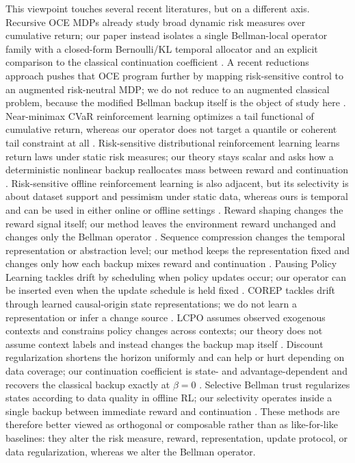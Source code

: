 \documentclass{article}
\theoremstyle{remark}
\begin{document}
This viewpoint touches several recent literatures, but on a different axis. Recursive OCE MDPs already study broad dynamic risk measures over cumulative return; our paper instead isolates a single Bellman-local operator family with a closed-form Bernoulli/KL temporal allocator and an explicit comparison to the classical continuation coefficient \citep{xu2023recursiveoce}. A recent reductions approach pushes that OCE program further by mapping risk-sensitive control to an augmented risk-neutral MDP; we do not reduce to an augmented classical problem, because the modified Bellman backup itself is the object of study here \citep{wang2025oce}. Near-minimax CVaR reinforcement learning optimizes a tail functional of cumulative return, whereas our operator does not target a quantile or coherent tail constraint at all \citep{wang2023near}. Risk-sensitive distributional reinforcement learning learns return laws under static risk measures; our theory stays scalar and asks how a deterministic nonlinear backup reallocates mass between reward and continuation \citep{chen2024distrl}. Risk-sensitive offline reinforcement learning is also adjacent, but its selectivity is about dataset support and pessimism under static data, whereas ours is temporal and can be used in either online or offline settings \citep{zhang2024riskoffline}. Reward shaping changes the reward signal itself; our method leaves the environment reward unchanged and changes only the Bellman operator \citep{ma2024assistant}. Sequence compression changes the temporal representation or abstraction level; our method keeps the representation fixed and changes only how each backup mixes reward and continuation \citep{ramesh2024chunked}. Pausing Policy Learning tackles drift by scheduling when policy updates occur; our operator can be inserted even when the update schedule is held fixed \citep{lee2024pausing}. COREP tackles drift through learned causal-origin state representations; we do not learn a representation or infer a change source \citep{zhang2024corep}. LCPO assumes observed exogenous contexts and constrains policy changes across contexts; our theory does not assume context labels and instead changes the backup map itself \citep{hamadanian2025lcpo}. Discount regularization shortens the horizon uniformly and can help or hurt depending on data coverage; our continuation coefficient is state- and advantage-dependent and recovers the classical backup exactly at $\beta=0$ \citep{rathnam2024discount}. Selective Bellman trust regularizes states according to data quality in offline RL; our selectivity operates inside a single backup between immediate reward and continuation \citep{luo2025trustbellman}. These methods are therefore better viewed as orthogonal or composable rather than as like-for-like baselines: they alter the risk measure, reward, representation, update protocol, or data regularization, whereas we alter the Bellman operator.
\end{document}
